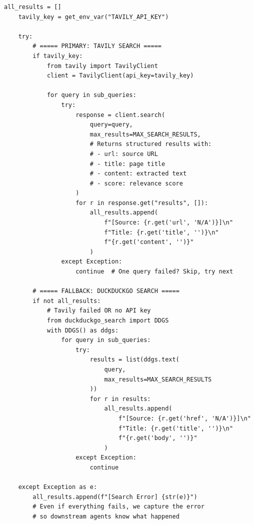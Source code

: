 \documentclass[11pt,a4paper,twoside]{report}
\begin{document}
\begin{lstlisting}[style=pythonstyle,caption={researcher.py --- Web Search with Fallback}]
    all_results = []
    tavily_key = get_env_var("TAVILY_API_KEY")

    try:
        # ===== PRIMARY: TAVILY SEARCH =====
        if tavily_key:
            from tavily import TavilyClient
            client = TavilyClient(api_key=tavily_key)

            for query in sub_queries:
                try:
                    response = client.search(
                        query=query,
                        max_results=MAX_SEARCH_RESULTS,
                        # Returns structured results with:
                        # - url: source URL
                        # - title: page title
                        # - content: extracted text
                        # - score: relevance score
                    )
                    for r in response.get("results", []):
                        all_results.append(
                            f"[Source: {r.get('url', 'N/A')}]\n"
                            f"Title: {r.get('title', '')}\n"
                            f"{r.get('content', '')}"
                        )
                except Exception:
                    continue  # One query failed? Skip, try next

        # ===== FALLBACK: DUCKDUCKGO SEARCH =====
        if not all_results:
            # Tavily failed OR no API key
            from duckduckgo_search import DDGS
            with DDGS() as ddgs:
                for query in sub_queries:
                    try:
                        results = list(ddgs.text(
                            query,
                            max_results=MAX_SEARCH_RESULTS
                        ))
                        for r in results:
                            all_results.append(
                                f"[Source: {r.get('href', 'N/A')}]\n"
                                f"Title: {r.get('title', '')}\n"
                                f"{r.get('body', '')}"
                            )
                    except Exception:
                        continue

    except Exception as e:
        all_results.append(f"[Search Error] {str(e)}")
        # Even if everything fails, we capture the error
        # so downstream agents know what happened
\end{lstlisting}
\end{document}
